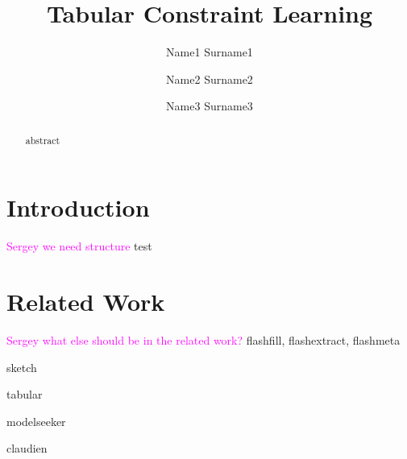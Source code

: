 \documentclass{ecai}
\newcommand{\sergey}[1]{\textcolor{magenta}{{\sc Sergey} #1}\xspace}
\begin{document}
\title{Tabular Constraint Learning}

\author{Name1 Surname1 \and Name2 Surname2 \and Name3 Surname3  }

\maketitle


\begin{abstract}
  abstract
  \end{abstract}
\section{Introduction}
\sergey{we need structure} test

\section{Related Work}
\sergey{what else should be in the related work?}
flashfill, flashextract, flashmeta \cite{flashfill,flashextract,flashmeta}

sketch \cite{sketch}

tabular \cite{tabular}

modelseeker \cite{modelseeker}

claudien \cite{claudien}


\end{document}
